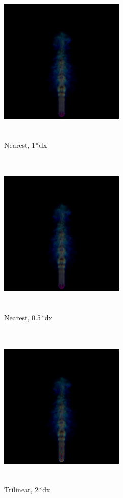 \documentclass[acmtog]{acmart}
\begin{document}
\begin{figure}[h]
	\centering
	\includegraphics[width=6cm,height=8cm]{Near+1.png}
	\caption{Nearest, 1*dx}
\end{figure}
\begin{figure}[h]
	\centering
	\includegraphics[width=6cm,height=8cm]{Near+half.png}
	\caption{Nearest, 0.5*dx}
\end{figure}
\begin{figure}[h]
	\centering
	\includegraphics[width=6cm,height=8cm]{Trilinear+2.png}
	\caption{Trilinear, 2*dx}
\end{figure}
\end{document}
